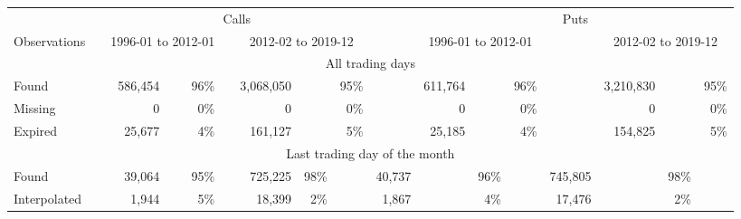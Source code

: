 

		\begin{tabular}{*{2}{l} *{15}{r} }
		       
		        
		         \multicolumn{2}{c}{}  & \multicolumn{7}{c}{Calls}  &  \multicolumn{1}{c}{} & 
		         \multicolumn{7}{c}{Puts} \\
		         
		          
		         \cline{3-9}
		         \cline{11-17}
		       
		         
		          \multicolumn{1}{l}{Observations} &  \multicolumn{1}{l}{} &
		          \multicolumn{3}{c}{1996-01 to 2012-01} & 
		          \multicolumn{1}{c}{} &
			\multicolumn{3}{c}{2012-02 to 2019-12} & 
			\multicolumn{1}{c}{} &
		          \multicolumn{3}{c}{1996-01 to 2012-01} & 
		          \multicolumn{1}{c}{} &
			\multicolumn{3}{c}{2012-02 to 2019-12} \\
		        

		       \hline
		       
		       \multicolumn{17}{c}{All trading days} \\ 
		       
		       \hline 

	
		Found &   & 
		586,454 &  & 96\% & 
		 & 
		 3,068,050 &  &95\% & 
		 & 
		 611,764 &  & 96\% & 
		 & 
		 3,210,830& &95\% 
		 \\

		
		Missing &   & 
		0 &  & 0\% & 
		 & 
		 0 &  &0\% & 
		 & 
		 0 &  & 0\% & 
		 & 
		 0& &0\% 
		 \\

		
		Expired &   & 
		25,677 &  & 4\% & 
		 & 
		 161,127 &  &5\% & 
		 & 
		 25,185 &  & 4\% & 
		 & 
		 154,825& &5\% 
		 \\

		
        \hline
        
         \multicolumn{17}{c}{Last trading day of the month} \\

	
		Found &   & 
		39,064 &  & 95\% & 
		 & 
		 725,225 & 98\% & 
		 & 
		 40,737 &  & 96\% & 
		 & 
		 745,805& &98\% 
		 \\

		
		Interpolated &   & 
		1,944 &  & 5\% & 
		 & 
		 18,399 & 2\% & 
		 & 
		 1,867 &  & 4\% & 
		 & 
		 17,476& &2\% 
		 \\

		

	        \hline
	    \end{tabular}
	